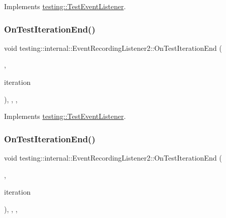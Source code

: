 Implements \mbox{\hyperlink{classtesting_1_1_test_event_listener_abb1c44525ef038500608b5dc2f17099b}{testing\+::\+Test\+Event\+Listener}}.

\mbox{\label{classtesting_1_1internal_1_1_event_recording_listener2_ae93c576efaf6f6d3afc455d05aa9eda8}} 
\subsubsection{\texorpdfstring{OnTestIterationEnd()}{OnTestIterationEnd()}\hspace{0.1cm}{\footnotesize\ttfamily [1/2]}}
{\footnotesize\ttfamily void testing\+::internal\+::\+Event\+Recording\+Listener2\+::\+On\+Test\+Iteration\+End (\begin{DoxyParamCaption}\item[{const \mbox{\hyperlink{classtesting_1_1_unit_test}{Unit\+Test}} \&}]{,  }\item[{int}]{iteration }\end{DoxyParamCaption})\hspace{0.3cm}{\ttfamily [inline]}, {\ttfamily [override]}, {\ttfamily [protected]}, {\ttfamily [virtual]}}



Implements \mbox{\hyperlink{classtesting_1_1_test_event_listener_a550fdb3e55726e4cefa09f5697941425}{testing\+::\+Test\+Event\+Listener}}.

\mbox{\label{classtesting_1_1internal_1_1_event_recording_listener2_ae93c576efaf6f6d3afc455d05aa9eda8}} 
\subsubsection{\texorpdfstring{OnTestIterationEnd()}{OnTestIterationEnd()}\hspace{0.1cm}{\footnotesize\ttfamily [2/2]}}
{\footnotesize\ttfamily void testing\+::internal\+::\+Event\+Recording\+Listener2\+::\+On\+Test\+Iteration\+End (\begin{DoxyParamCaption}\item[{const \mbox{\hyperlink{classtesting_1_1_unit_test}{Unit\+Test}} \&}]{,  }\item[{int}]{iteration }\end{DoxyParamCaption})\hspace{0.3cm}{\ttfamily [inline]}, {\ttfamily [override]}, {\ttfamily [protected]}, {\ttfamily [virtual]}}




